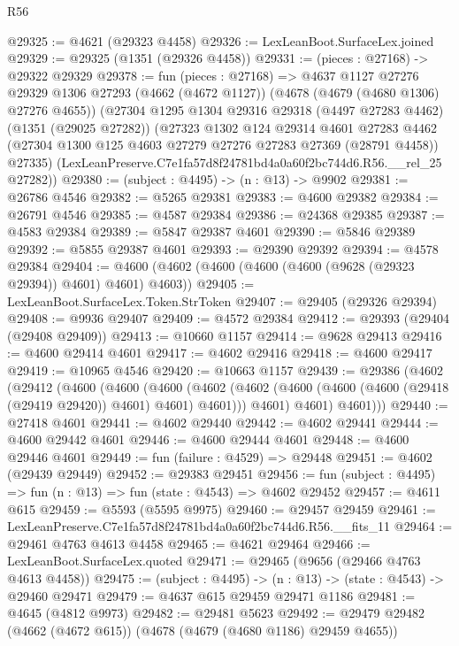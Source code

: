 \begin{lexlean}{R56}
\begin{coremodule}
@29325 := @4621 (@29323 @4458)
@29326 := LexLeanBoot.SurfaceLex.joined
@29329 := @29325 (@1351 (@29326 @4458))
@29331 := (pieces : @27168) -> @29322 @29329
@29378 := fun (pieces : @27168) =>
  @4637
    @1127
    @27276
    @29329
    @1306
    @27293
    (@4662 (@4672 @1127))
    (@4678 (@4679 (@4680 @1306) @27276 @4655))
    (@27304
      @1295
      @1304
      @29316
      @29318
      (@4497 @27283 @4462)
      (@1351 (@29025 @27282))
      (@27323
        @1302
        @124
        @29314
        @4601
        @27283
        @4462
        (@27304 @1300 @125 @4603 @27279 @27276 @27283 @27369 (@28791 @4458))
        @27335)
      (LexLeanPreserve.C7e1fa57d8f24781bd4a0a60f2bc744d6.R56.__rel_25 @27282))
@29380 := (subject : @4495) -> (n : @13) -> @9902
@29381 := @26786 @4546
@29382 := @5265 @29381
@29383 := @4600 @29382
@29384 := @26791 @4546
@29385 := @4587 @29384
@29386 := @24368 @29385
@29387 := @4583 @29384
@29389 := @5847 @29387 @4601
@29390 := @5846 @29389
@29392 := @5855 @29387 @4601
@29393 := @29390 @29392
@29394 := @4578 @29384
@29404 := @4600 (@4602 (@4600 (@4600 (@4600 (@9628 (@29323 @29394)) @4601) @4601) @4603))
@29405 := LexLeanBoot.SurfaceLex.Token.StrToken
@29407 := @29405 (@29326 @29394)
@29408 := @9936 @29407
@29409 := @4572 @29384
@29412 := @29393 (@29404 (@29408 @29409))
@29413 := @10660 @1157
@29414 := @9628 @29413
@29416 := @4600 @29414 @4601
@29417 := @4602 @29416
@29418 := @4600 @29417
@29419 := @10965 @4546
@29420 := @10663 @1157
@29439 := @29386
    (@4602
      (@29412
        (@4600
          (@4600
            (@4600
              (@4602 (@4602 (@4600 (@4600 (@4600 (@29418 (@29419 @29420)) @4601) @4601) @4601)))
              @4601)
            @4601)
          @4601)))
@29440 := @27418 @4601
@29441 := @4602 @29440
@29442 := @4602 @29441
@29444 := @4600 @29442 @4601
@29446 := @4600 @29444 @4601
@29448 := @4600 @29446 @4601
@29449 := fun (failure : @4529) => @29448
@29451 := @4602 (@29439 @29449)
@29452 := @29383 @29451
@29456 := fun (subject : @4495) => fun (n : @13) => fun (state : @4543) => @4602 @29452
@29457 := @4611 @615
@29459 := @5593 (@5595 @9975)
@29460 := @29457 @29459
@29461 := LexLeanPreserve.C7e1fa57d8f24781bd4a0a60f2bc744d6.R56.__fits_11
@29464 := @29461 @4763 @4613 @4458
@29465 := @4621 @29464
@29466 := LexLeanBoot.SurfaceLex.quoted
@29471 := @29465 (@9656 (@29466 @4763 @4613 @4458))
@29475 := (subject : @4495) -> (n : @13) -> (state : @4543) -> @29460 @29471
@29479 := @4637 @615 @29459 @29471 @1186
@29481 := @4645 (@4812 @9973)
@29482 := @29481 @5623
@29492 := @29479 @29482 (@4662 (@4672 @615)) (@4678 (@4679 (@4680 @1186) @29459 @4655))

\end{coremodule}
\end{lexlean}
